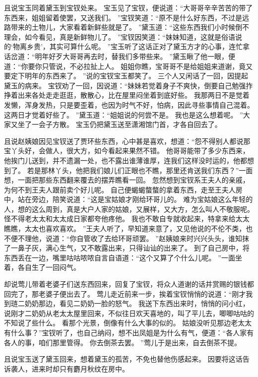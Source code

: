 且说宝玉同着黛玉到宝钗处来。
宝玉见了宝钗，便说道：“大哥哥辛辛苦苦的带了东西来，姐姐留着使罢，又送我们。
”宝钗笑道：“原不是什么好东西，不过是远路带来的土物儿，大家看着新鲜些就是了。
”黛玉道：“这些东西我们小时候倒不理会，如今看见，真是新鲜物儿了。
”宝钗因笑道：“妹妹知道，这就是俗语说的‘物离乡贵’，其实可算什么呢。
”宝玉听了这话正对了黛玉方才的心事，连忙拿话岔道：“明年好歹大哥哥再去时，替我们多带些来。
”黛玉瞅了他一眼，便道：“你要你只管说，不必拉扯上人。
姐姐你瞧，宝哥哥不是给姐姐来道谢，竟又要定下明年的东西来了。
”说的宝钗宝玉都笑了。
三个人又闲话了一回，因提起黛玉的病来。
宝钗劝了一回，因说道：“妹妹若觉着身子不爽快，倒要自己勉强拃挣着出来各处走走逛逛，散散心，比在屋里闷坐着到底好些。
我那两日不是觉着发懒，浑身发热，只是要歪着，也因为时气不好，怕病，因此寻些事情自己混着。
这两日才觉着好些了。
”黛玉道：“姐姐说的何尝不是。
我也是这么想着呢。
”大家又坐了一会子方散。
宝玉仍把黛玉送至潇湘馆门首，才各自回去了。
\par
且说赵姨娘因见宝钗送了贾环些东西，心中甚是喜欢，想道：“怨不得别人都说那宝丫头好，会做人，很大方，如今看起来果然不错。
他哥哥能带了多少东西来，他挨门儿送到，并不遗漏一处，也不露出谁薄谁厚，连我们这样没时运的，他都想到了。
若是那林丫头，他把我们娘儿们正眼也不瞧，那里还肯送我们东西？”一面想，一面把那些东西翻来覆去的摆弄瞧看一回。
忽然想到宝钗系王夫人的亲戚，为何不到王夫人跟前卖个好儿呢。
自己便蝎蝎螫螫的拿着东西，走至王夫人房中，站在旁边，陪笑说道：“这是宝姑娘才刚给环哥儿的。
难为宝姑娘这么年轻的人，想的这么周到，真是大户人家的姑娘，又展样，又大方，怎么叫人不敬服呢。
怪不得老太太和太太成日家都夸他疼他。
我也不敢自专就收起来，特拿来给太太瞧瞧，太太也喜欢喜欢。
”王夫人听了，早知道来意了，又见他说的不伦不类，也不便不理他，说道：“你自管收了去给环哥顽罢。
”赵姨娘来时兴兴头头，谁知抹了一鼻子灰，满心生气，又不敢露出来，只得讪讪的出来了。
到了自己房中，将东西丢在一边，嘴里咕咕哝哝自言自语道：“这个又算了个什么儿呢。
”一面坐着，各自生了一回闷气。
\par
却说莺儿带着老婆子们送东西回来，回复了宝钗，将众人道谢的话并赏赐的银钱都回完了，那老婆子便出去了。
莺儿走近前来一步，挨着宝钗悄悄的说道：“刚才我到琏二奶奶那边，看见二奶奶一脸的怒气。
我送下东西出来时，悄悄的问小红，说刚才二奶奶从老太太屋里回来，不似往日欢天喜地的，叫了平儿去，唧唧咕咕的不知说了些什么。
看那个光景，倒像有什么大事的似的。
姑娘没听见那边老太太有什么事？”宝钗听了，也自己纳闷，想不出凤姐是为什么有气，便道：“各人家有各人的事，咱们那里管得。
你去倒茶去罢。
”莺儿于是出来，自去倒茶不提。
\par
且说宝玉送了黛玉回来，想着黛玉的孤苦，不免也替他伤感起来。
因要将这话告诉袭人，进来时却只有麝月秋纹在房中。

